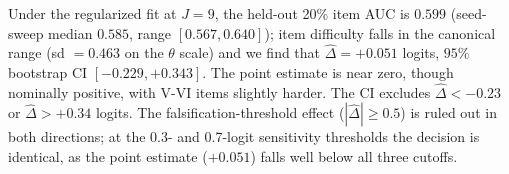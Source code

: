 \documentclass{article}
\begin{document}
Under the regularized fit at $J = 9$, the held-out 20\% item AUC is $0.599$ (seed-sweep median $0.585$, range $[0.567, 0.640]$); item difficulty falls in the canonical range (sd $= 0.463$ on the $\theta$ scale) and we find that $\hat\Delta = +0.051$ logits, $95\%$ bootstrap CI $[-0.229, +0.343]$. The point estimate is near zero, though nominally positive, with V-VI items slightly harder. The CI excludes $\hat\Delta < -0.23$ or $\hat\Delta > +0.34$ logits. The falsification-threshold effect ($|\hat\Delta| \geq 0.5$) is ruled out in both directions; at the 0.3- and 0.7-logit sensitivity thresholds the decision is identical, as the point estimate ($+0.051$) falls well below all three cutoffs. %
\end{document}
